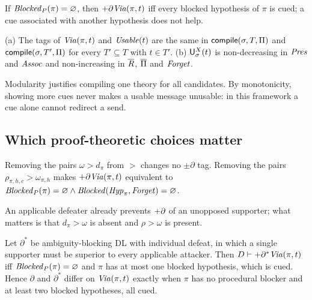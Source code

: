 \begin{corollary}\label{cor:recovery}
If $\mathit{Blocked}_{P}(\pi)=\varnothing$, then $+\partial\mathit{Via}(\pi,t)$ iff every blocked hypothesis of $\pi$ is cued; a cue associated with another hypothesis does not help.
\end{corollary}

\begin{proposition}\label{prop:mono}
(a) The tags of $\mathit{Via}(\pi,t)$ and $\mathit{Usable}(t)$ are the same in $\mathsf{compile}(\sigma,T,\Pi)$ and $\mathsf{compile}(\sigma,T',\Pi)$ for every $T'\subseteq T$ with $t\in T'$. (b) $\mathsf{U}^{X}_{\sigma}(t)$ is non-decreasing in $\mathit{Pres}$ and $\mathit{Assoc}$ and non-increasing in $\overline{R}$, $\overline{\Pi}$ and $\mathit{Forget}$.
\end{proposition}

Modularity justifies compiling one theory for all candidates. By monotonicity, showing more cues never makes a usable message unusable: in this framework a cue alone cannot redirect a send.

\subsection{Which proof-theoretic choices matter}
\label{sec:choices}

\begin{proposition}[Priorities]\label{prop:priorities}
Removing the pairs $\omega>d_\pi$ from $>$ changes no $\pm\partial$ tag. Removing the pairs $\rho_{\pi,h,c}>\omega_{\pi,h}$ makes $+\partial\mathit{Via}(\pi,t)$ equivalent to $\mathit{Blocked}_{P}(\pi)=\varnothing\wedge\mathit{Blocked}(\mathit{Hyp}_\pi,\mathit{Forget})=\varnothing$.
\end{proposition}

An applicable defeater already prevents $+\partial$ of an unopposed supporter; what matters is that $d_\pi>\omega$ is absent and $\rho>\omega$ is present.

\begin{proposition}\label{prop:team}
Let $\partial^{*}$ be ambiguity-blocking DL with individual defeat, in which a single supporter must be superior to every applicable attacker. Then $D\vdash+\partial^{*}\mathit{Via}(\pi,t)$ iff $\mathit{Blocked}_{P}(\pi)=\varnothing$ and $\pi$ has at most one blocked hypothesis, which is cued. Hence $\partial$ and $\partial^{*}$ differ on $\mathit{Via}(\pi,t)$ exactly when $\pi$ has no procedural blocker and at least two blocked hypotheses, all cued.
\end{proposition}

